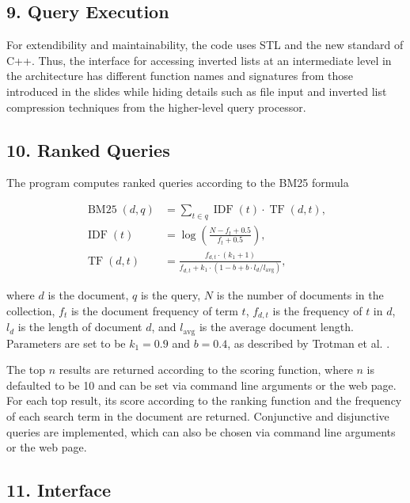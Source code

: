 \documentclass[12pt]{article}
\begin{document}
\hypertarget{9-query-execution}{%
\subsection{9. Query Execution}\label{9-query-execution}}

For extendibility and maintainability, the code uses STL and the new
standard of C++. Thus, the interface for accessing inverted lists at an
intermediate level in the architecture has different function names and
signatures from those introduced in the slides while hiding details such
as file input and inverted list compression techniques from the
higher-level query processor.

\hypertarget{10-ranked-queries}{%
\subsection{10. Ranked Queries}\label{10-ranked-queries}}

The program computes ranked queries according to the BM25 formula \cite{c1}

\begin{align}
\operatorname{BM25}(d, q) &= \sum_{t \in q} \operatorname{IDF}(t) \cdot \operatorname{TF}(d, t), \\
\operatorname{IDF}(t) &= \log \left(\frac{N-f_t+0.5}{f_t+0.5}\right), \\
\operatorname{TF}(d, t) &= \frac{f_{d, t} \cdot\left(k_1+1\right)}{f_{d, t}+k_1 \cdot\left(1-b+b \cdot l_d / l_{\mathrm{avg}}\right)},
\end{align}

where \(d\) is the document, \(q\) is the query, \(N\) is the number of
documents in the collection, \(f_t\) is the document frequency of term
\(t\), \(f_{d,t}\) is the frequency of \(t\) in \(d\), \(l_d\) is the
length of document \(d\), and \(l_\text{avg}\) is the average document
length. Parameters are set to be \(k_1 = 0.9\) and \(b = 0.4\), as
described by Trotman et al. \cite{c2}.

The top \(n\) results are returned according to the scoring function,
where \(n\) is defaulted to be 10 and can be set via command line
arguments or the web page. For each top result, its score according to
the ranking function and the frequency of each search term in the
document are returned. Conjunctive and disjunctive queries are
implemented, which can also be chosen via command line arguments or the
web page.

\hypertarget{11-interface}{%
\subsection{11. Interface}\label{11-interface}}
\end{document}
